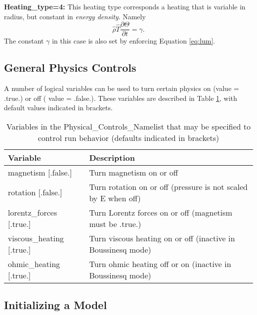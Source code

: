 \textbf{Heating\_type=4:}
This heating type corresponds a heating that is variable in radius, but constant in \textit{energy density}.  Namely
\begin{equation}
\hat{\rho}\hat{T}\frac{\partial \Theta}{\partial t}=\gamma.
\end{equation}
The constant $\gamma$ in this case is also set by enforcing Equation \ref{eq:lum}.

\subsection{General Physics Controls}
A number of logical variables can be used to turn certain physics on (value = .true.) or off ( value = .false.).  These variables are described in Table \ref{table:logicals}, with default values indicated in brackets.
\begin{table}
\centering
\begin{tabular}{| l | l |}
\hline
Variable & Description \\
\hline
magnetism        [.false.]          & Turn magnetism on or off \\
rotation         [.false.]           & Turn rotation on or off (pressure is not scaled by E when off) \\
lorentz\_forces  [.true.]     & Turn Lorentz forces on or off (magnetism must be .true.) \\
viscous\_heating [.true.]    & Turn viscous heating on or off (inactive in Boussinesq mode) \\
ohmic\_heating   [.true.]      & Turn ohmic heating off or on (inactive in Boussinesq mode) \\
\hline
\end{tabular}
\caption{\label{table:logicals} Variables in the Physical\_Controls\_Namelist that may be specified to control run behavior (defaults indicated in brackets)}
\end{table}

\subsection{Initializing a Model}

